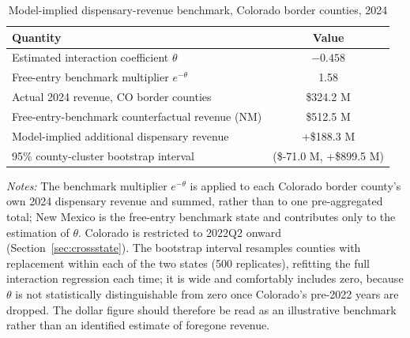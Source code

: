 \begin{table}[htbp]
\centering
\caption{Model-implied dispensary-revenue benchmark, Colorado border counties, 2024}
\label{tab:counterfactual}
\footnotesize
\begin{tabular}{lc}
\toprule
Quantity & Value \\
\midrule
Estimated interaction coefficient $\theta$ & $-0.458$ \\
Free-entry benchmark multiplier $e^{-\theta}$ & 1.58 \\
\midrule
Actual 2024 revenue, CO border counties & \$324.2 M \\
Free-entry-benchmark counterfactual revenue (NM) & \$512.5 M \\
Model-implied additional dispensary revenue & +\$188.3 M \\
95\% county-cluster bootstrap interval & (\$-71.0 M, +\$899.5 M) \\
\bottomrule
\end{tabular}
\begin{minipage}{0.98\textwidth}
\vspace{0.5em}

\fontsize{9pt}{11pt}\selectfont
\textit{Notes:} The benchmark multiplier $e^{-\theta}$ is applied to each
Colorado border county's own 2024 dispensary revenue and summed, rather than to
one pre-aggregated total; New Mexico is the free-entry benchmark state and
contributes only to the estimation of $\theta$. Colorado is restricted to 2022Q2
onward (Section~\ref{sec:crossstate}). The bootstrap interval resamples counties
with replacement within each of the two states (500 replicates), refitting the
full interaction regression each time; it is wide and comfortably includes zero,
because $\theta$ is not statistically distinguishable from zero once Colorado's
pre-2022 years are dropped. The dollar figure should therefore be read as an
illustrative benchmark rather than an identified estimate of foregone revenue.
\end{minipage}
\end{table}
